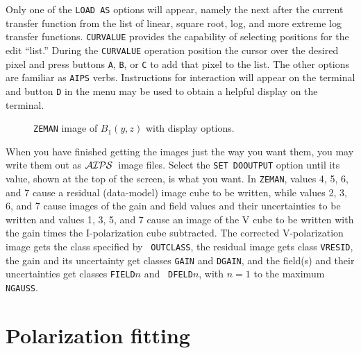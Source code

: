 \documentclass[twoside]{article}
\newcommand{\AIPS}{{$\cal AIPS\/$}}
\newcommand{\putfig}[1]{\texttt{[image: \#1.eps]}}
\begin{document}
Only one of the {\tt LOAD AS} options will appear, namely the next
after the current transfer function from the list of linear, square
root, log, and more extreme log transfer functions.  {\tt CURVALUE}
provides the capability of selecting positions for the edit ``list.''
During the {\tt CURVALUE} operation position the cursor over the
desired pixel and press buttons {\tt A}, {\tt B}, or {\tt C} to add
that pixel to the list.  The other options are familiar as {\tt AIPS}
verbs.  Instructions for interaction will appear on the terminal and
button {\tt D} in the menu may be used to obtain a helpful display on
the terminal.

\begin{figure}
\begin{center}
\resizebox{6.0in}{!}{\putfig{ZEMAN.field1}}
\caption{{\tt ZEMAN} image of $B_1(y,z)$ with display options.}
\label{fig:ZEMAN.field1}
\end{center}
\end{figure}

When you have finished getting the images just the way you want them,
you may write them out as \AIPS\ image files.  Select the {\tt SET
  DOOUTPUT} option until its value, shown at the top of the screen, is
what you want.  In {\tt ZEMAN}, values 4, 5, 6, and 7 cause a residual
(data-model) image cube to be written, while values 2, 3, 6, and 7
cause images of the gain and field values and their uncertainties to
be written and values 1, 3, 5, and 7 cause an image of the V cube to
be written with the gain times the I-polarization cube subtracted.
The corrected V-polarization image gets the class specified by {\tt
  OUTCLASS}, the residual image gets class {\tt VRESID}, the gain and
its uncertainty get classes {\tt GAIN} and {\tt DGAIN}, and the
field(s) and their uncertainties get classes {\tt FIELD}$n$ and {\tt
  DFELD}$n$, with $n = 1$ to the maximum {\tt NGAUSS}\@.

\section{Polarization fitting}
\end{document}
